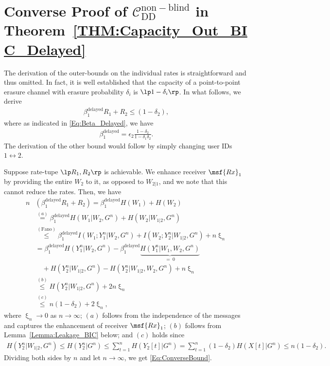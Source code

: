 \appendices


\section{Converse Proof of $\mathcal{C}^\mathrm{non-blind}_\mathrm{DD}$ in Theorem~\ref{THM:Capacity_Out_BIC_Delayed}}
\label{Section:DDBounds}


The derivation of the outer-bounds on the individual rates is straightforward and thus omitted. In fact, it is well established that the capacity of a point-to-point erasure channel with erasure probability $\delta_i$ is $\lp 1 - \delta_i \rp$. In what follows, we derive
\begin{align}
\label{Eq:ConverseBound}
\beta_1^{\mathrm{delayed}} R_1 + R_{2} \leq \left( 1 - \delta_2 \right),
\end{align}
where as indicated in \eqref{Eq:Beta_Delayed}, we have
\begin{align}
\label{Eq:beta1recap}
\beta_1^{\mathrm{delayed}} = \epsilon_2 \frac{1-\delta_2}{1-\delta_1\delta_2}.
\end{align}
The derivation of the other bound would follow by simply changing user IDs $1 \leftrightarrow 2$.



Suppose rate-tupe $\lp R_1, R_2 \rp$ is achievable. We enhance receiver $\msf{Rx}_1$ by providing the entire $W_2$ to it, as opposed to $W_{2|1}$, and we note that this cannot reduce the rates. Then, we have
\begin{align}
n &\left( \beta_1^{\mathrm{delayed}} R_1 + R_2 \right) = \beta_1^{\mathrm{delayed}} H(W_1) + H(W_2) \nonumber \\
& \overset{(a)}= \beta_1^{\mathrm{delayed}} H(W_1|W_2, G^n) + H(W_2|W_{1|2},G^n) \nonumber \\
& \overset{(\mathrm{Fano})}\leq \beta_1^{\mathrm{delayed}} I(W_1;Y_1^n|W_2,G^n) + I(W_2;Y_2^n|W_{1|2},G^n) + n \upxi_n \nonumber \\
& = \beta_1^{\mathrm{delayed}} H(Y_1^n|W_2,G^n) - \beta_1^{\mathrm{delayed}} \underbrace{H(Y_1^n|W_1,W_2,G^n)}_{=~0} \nonumber \\
& \quad + H(Y_2^n|W_{1|2},G^n) - H(Y_2^n|W_{1|2},W_2,G^n) + n \upxi_n \nonumber \\
& \overset{(b)}\leq H(Y_2^n|W_{1|2},G^n) + 2n \upxi_n \nonumber \\
& \overset{(c)}\leq n \left( 1 - \delta_2 \right) + 2\upxi_n,
\end{align}
where $\upxi_n \rightarrow 0$ as $n \rightarrow \infty$; $(a)$ follows from the independence of the messages and captures the enhancement of receiver $\msf{Rx}_1$; $(b)$ follows from Lemma~\ref{Lemma:Leakage_BIC} below; and $(c)$ holds since
\begin{align}
H(Y_2^n|W_{1|2},G^n) \leq H(Y_2^n|G^n) \leq \sum_{t=1}^{n}{ H(Y_2[t]|G^n)} = \sum_{t=1}^{n}{(1-\delta_2)H(X[t]|G^n)} \leq n(1-\delta_2).
\end{align}
Dividing both sides by $n$ and let $n \rightarrow \infty$, we get \eqref{Eq:ConverseBound}.

